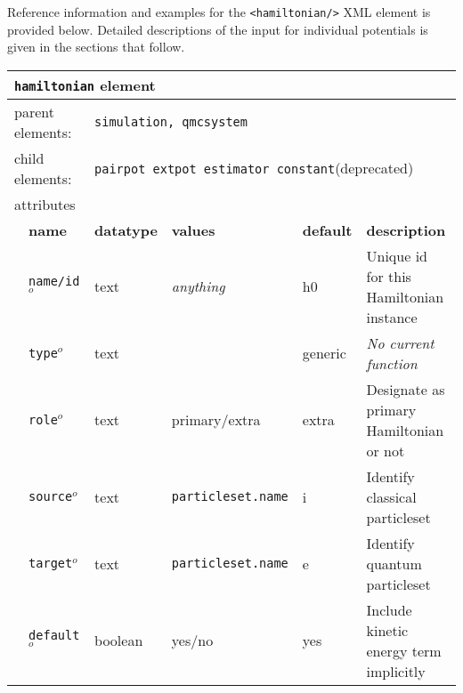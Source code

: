 Reference information and examples for the \texttt{<hamiltonian/>} XML element is provided below.  Detailed descriptions of the input for individual potentials is given in the sections that follow.  


\FloatBarrier
\begin{table}[h]
\begin{center}
\begin{tabularx}{\textwidth}{l l l l l l }
\hline
\multicolumn{6}{l}{\texttt{hamiltonian} element} \\
\hline
\multicolumn{2}{l}{parent elements:} & \multicolumn{4}{l}{\texttt{simulation, qmcsystem}}\\
\multicolumn{2}{l}{child  elements:} & \multicolumn{4}{l}{\texttt{pairpot extpot estimator constant}(deprecated)}\\
\multicolumn{2}{l}{attributes}  & \multicolumn{4}{l}{}\\
   &   \bfseries name     & \bfseries datatype & \bfseries values & \bfseries default & \bfseries description \\
   & \texttt{name/id}$^o$ &  text              & \textit{anything}& h0                & Unique id for this Hamiltonian instance  \\
   & \texttt{type}$^o$    &  text              &                  & generic           & \textit{No current function}             \\
   & \texttt{role}$^o$    &  text              & primary/extra    & extra             & Designate as primary Hamiltonian or not  \\
   & \texttt{source}$^o$  &  text              & \texttt{particleset.name} & i        & Identify classical particleset           \\
   & \texttt{target}$^o$  &  text              & \texttt{particleset.name} & e        & Identify quantum particleset             \\
   & \texttt{default}$^o$ &  boolean           & yes/no           & yes               & Include kinetic energy term implicitly   \\
  \hline
\end{tabularx}
\end{center}
\end{table}
\FloatBarrier

